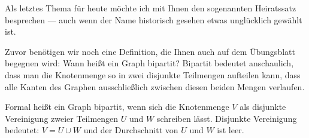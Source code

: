 \begin{spoken-clean}[00:56:52 - 00:58:30]
Als letztes Thema für heute möchte ich mit Ihnen den sogenannten Heiratssatz besprechen --- auch wenn der Name historisch gesehen etwas unglücklich gewählt ist.

Zuvor benötigen wir noch eine Definition, die Ihnen auch auf dem Übungsblatt begegnen wird: Wann heißt ein Graph bipartit? Bipartit bedeutet anschaulich, dass man die Knotenmenge so in zwei disjunkte Teilmengen aufteilen kann, dass alle Kanten des Graphen ausschließlich zwischen diesen beiden Mengen verlaufen.

Formal heißt ein Graph bipartit, wenn sich die Knotenmenge $V$ als disjunkte Vereinigung zweier Teilmengen $U$ und $W$ schreiben lässt. Disjunkte Vereinigung bedeutet: $V = U \cup W$ und der Durchschnitt von $U$ und $W$ ist leer.
\end{spoken-clean}

